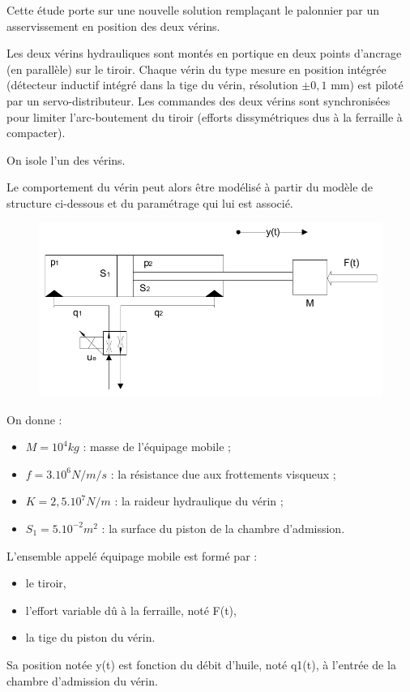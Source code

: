 Cette étude porte sur une nouvelle solution remplaçant le palonnier par un asservissement en position des deux vérins.

Les deux vérins hydrauliques sont montés en portique en deux points d'ancrage (en parallèle) sur le tiroir. Chaque vérin du type \og mesure en position intégrée \fg (détecteur inductif intégré dans la tige du vérin, résolution $\pm 0,1$ mm) est piloté par un servo-distributeur. Les commandes des deux vérins sont synchronisées pour limiter l'arc-boutement du tiroir (efforts dissymétriques dus à la ferraille à compacter).

On isole l'un des vérins.

Le comportement du vérin peut alors être modélisé à partir du modèle de structure ci-dessous et du paramétrage qui lui est associé.

\begin{figure}[!h]
 \centering\includegraphics[width=0.7\linewidth]{img/fig3.png}
\end{figure}

On donne :
\begin{itemize}
 \item $M=10^4kg$ : masse de l'équipage mobile ;
 \item $f=3.10^6N/m/s$ : la résistance due aux frottements visqueux ;
 \item $K=2,5.10^7N/m$ : la raideur hydraulique du vérin ;
 \item $S_1=5.10^{-2}m^2$ : la surface du piston de la chambre d'admission.
\end{itemize}

L'ensemble appelé \og équipage mobile \fg est formé par :
\begin{itemize}
 \item le tiroir,
 \item l'effort variable dû à la ferraille, noté F(t),
 \item la tige du piston du vérin.
\end{itemize}

Sa position notée y(t) est fonction du débit d'huile, noté q1(t), à l'entrée de la chambre d'admission du vérin.

